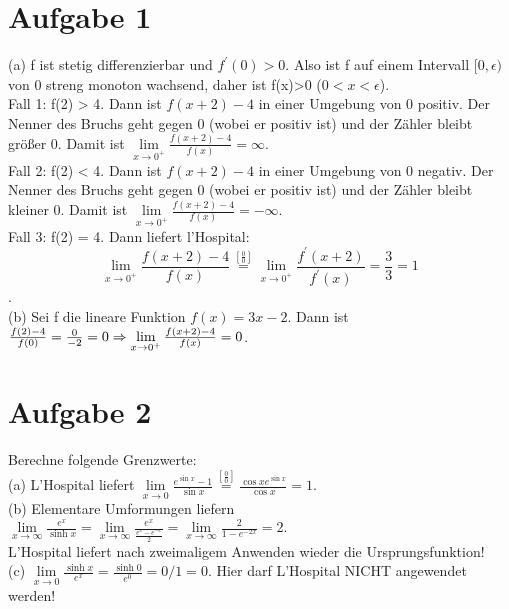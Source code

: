 \documentclass{scrartcl}
\begin{document}
\section*{Aufgabe 1}
(a) f ist stetig differenzierbar und $f^\prime(0)>0$. Also ist f auf einem Intervall $[0,\epsilon)$ 
von 0 streng monoton wachsend, daher ist f(x)>0 ($0<x<\epsilon$).\\
Fall 1: f(2) > 4. Dann ist $f(x+2)-4$ in einer Umgebung von 0 positiv. Der Nenner des Bruchs geht gegen 0 (wobei er positiv ist) 
und der Zähler bleibt größer 0. Damit ist $\lim\limits_{x\rightarrow0^+}\frac{f(x+2)-4}{f(x)}=\infty$.\\
Fall 2: f(2) < 4. Dann ist $f(x+2)-4$ in einer Umgebung von 0 negativ. Der Nenner des Bruchs geht gegen 0 (wobei er positiv ist) 
und der Zähler bleibt kleiner 0. Damit ist $\lim\limits_{x\rightarrow0^+}\frac{f(x+2)-4}{f(x)}=-\infty$.\\
Fall 3: f(2) = 4. Dann liefert l'Hospital:
\[\lim\limits_{x\rightarrow0^+}\frac{f(x+2)-4}{f(x)}\stackrel{[\frac 0 0]}{=}
\lim\limits_{x\rightarrow0^+}\frac{f^\prime(x+2)}{f^\prime(x)}=\frac 3 3=1\].\\
(b) Sei f die lineare Funktion $f(x)=3x-2$. Dann ist $\frac{f(2)-4}{f(0)}=\frac{0}{-2}=0\\
\Rightarrow\lim\limits_{x\rightarrow0^+}\frac{f(x+2)-4}{f(x)}=0$.


\section*{Aufgabe 2}
Berechne folgende Grenzwerte:\\
(a) L'Hospital liefert $\lim\limits_{x\rightarrow0}\frac{e^{\sin x}-1}{\sin x}
\stackrel{[\frac 0 0]}{=}\frac{\cos xe^{\sin x}}{\cos x}=1.$\\
(b) Elementare Umformungen liefern $\lim\limits_{x\rightarrow\infty}\frac{e^x}{\sinh x}=
\lim\limits_{x\rightarrow\infty}\frac{e^x}{\frac{e^x-e^{-x}}{2}}=
\lim\limits_{x\rightarrow\infty}\frac{2}{1-e^{-2x}}=2.$\\[0.2em]
L'Hospital liefert nach zweimaligem Anwenden wieder die Ursprungsfunktion!\\
(c) $\lim\limits_{x\rightarrow0}\frac{\sinh x}{e^x}=\frac{\sinh 0}{e^0}=0/1=0.$ Hier darf L'Hospital NICHT angewendet werden!
\end{document}
